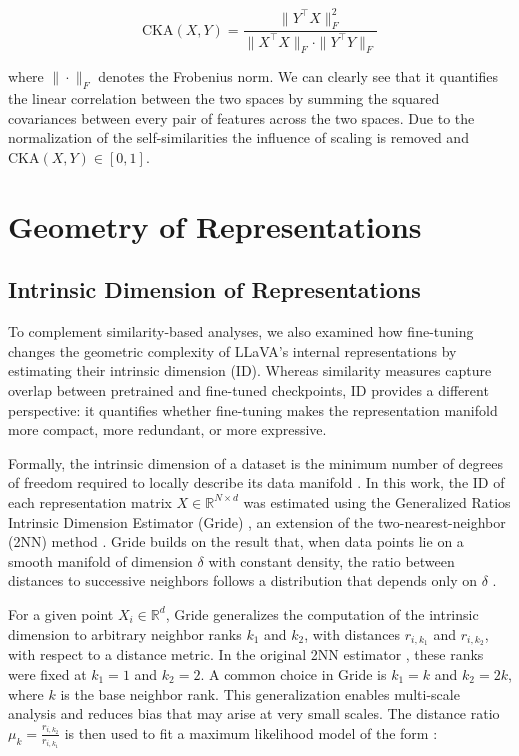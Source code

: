 \begin{equation*}
    \text{CKA}(X,Y) = \frac{\|Y^\top X\|_F^2}{\|X^\top X\|_F \cdot \|Y^\top Y\|_F}
    \label{eq:cka}
\end{equation*}

where $\| \cdot \|_F$ denotes the Frobenius norm. We can clearly see that it quantifies the linear correlation between the two spaces by summing the squared covariances between every pair of features across the two spaces. Due to the normalization of the self-similarities the influence of scaling is removed and $\text{CKA}(X,Y) \in [0,1]$.

\section{Geometry of Representations}

\subsection{Intrinsic Dimension of Representations}\label{sec:id}

To complement similarity-based analyses, we also examined how fine-tuning changes the geometric complexity of LLaVA's internal representations by estimating their intrinsic dimension (ID). Whereas similarity measures capture overlap between pretrained and fine-tuned checkpoints, ID provides a different perspective: it quantifies whether fine-tuning makes the representation manifold more compact, more redundant, or more expressive.

Formally, the intrinsic dimension of a dataset is the minimum number of degrees of freedom required to locally describe its data manifold \cite{ansuiniIntrinsicDimensionData2019}. In this work, the ID of each representation matrix $X \in \mathbb{R}^{N \times d}$ was estimated using the Generalized Ratios Intrinsic Dimension Estimator (Gride) \cite{dentiGeneralizedRatiosIntrinsic2022}, an extension of the two-nearest-neighbor (2NN) method \cite{faccoEstimatingIntrinsicDimension2017}. Gride builds on the result that, when data points lie on a smooth manifold of dimension $\delta$ with constant density, the ratio between distances to successive neighbors follows a distribution that depends only on $\delta$ \cite{faccoEstimatingIntrinsicDimension2017,dentiGeneralizedRatiosIntrinsic2022}.

For a given point $X_i \in \mathbb{R}^d$, Gride generalizes the computation of the intrinsic dimension to arbitrary neighbor ranks $k_1$ and $k_2$, with distances $r_{i,k_1}$ and $r_{i,k_2}$, with respect to a distance metric. In the original 2NN estimator \cite{faccoEstimatingIntrinsicDimension2017}, these ranks were fixed at $k_1 = 1$ and $k_2 = 2$. A common choice in Gride \cite{dentiGeneralizedRatiosIntrinsic2022, doimoRepresentationLandscapeFewShot} is $k_1 = k$ and $k_2 = 2k$, where $k$ is the base neighbor rank. This generalization enables multi-scale analysis and reduces bias that may arise at very small scales. The distance ratio $\mu_k = \frac{r_{i,k_2}}{r_{i,k_1}}$ is then used to fit a maximum likelihood model of the form \cite{dentiGeneralizedRatiosIntrinsic2022}:

